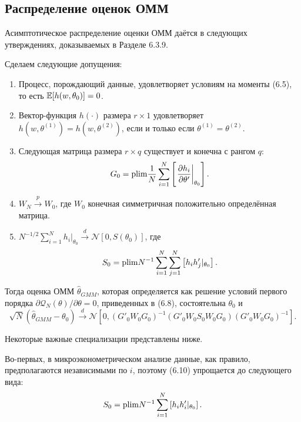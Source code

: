 \subsection{Распределение оценок ОММ}

Асимптотическое распределение оценки ОММ даётся в следующих утверждениях, доказываемых в Разделе 6.3.9.

\begin{proposition} Сделаем следующие допущения:
\begin{enumerate}
\item Процесс, порождающий данные, удовлетворяет условиям на моменты (6.5), то есть $\mathbb{E}[h(w,\theta_0)]=0$.
\item Вектор-функция $h(\cdot)$ размера $r \times 1$ удовлетворяет $h(w,\theta^{(1)})=h(w,\theta^{(2)})$, если и только если $\theta^{(1)}=\theta^{(2)}$.
\item  Следующая матрица размера $r \times q$ существует и конечна с рангом $q$: 
\begin{equation}
G_0=\mathrm{plim } \frac{1}{N} \sum_{i=1}^{N} \left[ \left. \frac{\partial h_i}{\partial \theta'} \right|_{\theta_0} \right].
\end{equation}
\item  $W_N \xrightarrow{p} W_0$, где $W_0$ конечная симметричная положительно определённая матрица. 
\item $N^{-1/2} \sum_{i=1}^{N} h_i|_{\theta_0} \xrightarrow{d} \mathcal{N}[0,S(\theta_0)]$, где 
\begin{equation}
S_0=\mathrm{plim } N^{-1} \sum_{i=1}^{N} \sum_{j=1}^{N} \left[ h_i h'_j|_{\theta_0} \right].
\end{equation}
\end{enumerate}
Тогда оценка ОММ $\hat{\theta}_{GMM}$, которая определяется как решение условий первого порядка $\partial \mathcal{Q}_{N}(\theta) / \partial \theta=0$, приведенных в (6.8), состоятельна $\theta_0$ и
\begin{equation}
\sqrt{N} (\hat{\theta}_{GMM}-\theta_0) \xrightarrow{d} \mathcal{N}[0,(G'_0 W_0 G_0)^{-1} (G'_0 W_0 S_0 W_0 G_0) (G'_0 W_0 G_0)^{-1}].
\end{equation}
\end{proposition}

Некоторые важные специализации представлены ниже.

Во-первых, в микроэконометрическом анализе данные, как правило, предполагаются независимыми по $i$, поэтому (6.10) упрощается до следующего вида:
\begin{equation}
S_0= \mathrm{plim } N^{-1} \sum_{i=1}^{N} \left[ h_i h'_i|_{\theta_0} \right].
\end{equation}

